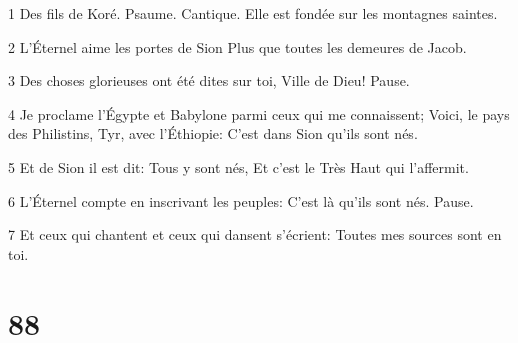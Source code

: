 \par 1 Des fils de Koré. Psaume. Cantique. Elle est fondée sur les montagnes saintes.
\par 2 L'Éternel aime les portes de Sion Plus que toutes les demeures de Jacob.
\par 3 Des choses glorieuses ont été dites sur toi, Ville de Dieu! Pause.
\par 4 Je proclame l'Égypte et Babylone parmi ceux qui me connaissent; Voici, le pays des Philistins, Tyr, avec l'Éthiopie: C'est dans Sion qu'ils sont nés.
\par 5 Et de Sion il est dit: Tous y sont nés, Et c'est le Très Haut qui l'affermit.
\par 6 L'Éternel compte en inscrivant les peuples: C'est là qu'ils sont nés. Pause.
\par 7 Et ceux qui chantent et ceux qui dansent s'écrient: Toutes mes sources sont en toi.

\chapter{88}

